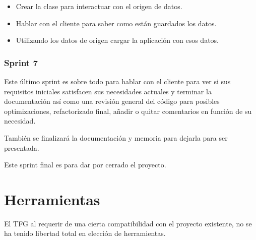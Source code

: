\begin{itemize}
    \item Crear la clase para interactuar con el origen de datos.
    \item Hablar con el cliente para saber como est\'{a}n guardados los datos.
    \item Utilizando los datos de origen cargar la aplicaci\'{o}n con esos datos.
\end{itemize}

\subsubsection{Sprint 7}
Este \'ultimo sprint es sobre todo para hablar con el cliente para
ver si sus requisitos iniciales satisfacen sus necesidades actuales
y terminar la documentaci\'on as\'i como una revisi\'on general del c\'odigo
para posibles optimizaciones, refactorizado final, a\~nadir o quitar comentarios
en funci\'on de su necesidad.

Tambi\'en se finalizar\'a la documentaci\'on y memoria para dejarla para ser presentada.

Este sprint final es para dar por cerrado el proyecto.

\section{Herramientas}
El TFG al requerir de una cierta compatibilidad con el proyecto
existente, no se ha tenido libertad total en 
elecci\'on de herramientas. 


